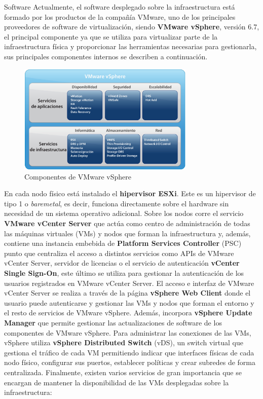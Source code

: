 \begin{section}{Software}
\label{subsec:softwareinstalado}
Actualmente, el software desplegado sobre la infraestructura está formado por los productos de la compañía VMware, uno de los principales proveedores de software de virtualización, siendo \textbf{VMware vSphere}, versión 6.7, el principal componente ya que se utiliza para virtualizar parte de la infraestructura física y proporcionar las herramientas necesarias para gestionarla, sus principales componentes internos se describen a continuación.
\begin{figure}[h]
    \centering
    \includegraphics[width=0.75\textwidth]{imaxes/cap2recursos/contentVSphere}
    \caption{Componentes de VMware vSphere\cite{fotovSphere}}
    \label{fig:vSphere-components}
  \end{figure}
En cada nodo físico está instalado el \textbf{hipervisor ESXi}. Este es un hipervisor de tipo 1 o \textit{baremetal}, es decir, funciona directamente sobre el hardware sin necesidad de un sistema operativo adicional. Sobre los nodos corre el servicio \textbf{VMware vCenter Server} que actúa como centro de administración de todas las máquinas virtuales (VMs) y nodos que forman la infraestructura y, además, contiene una instancia embebida de \textbf{Platform Services Controller} (PSC) punto que centraliza el acceso a distintos servicios como APIs de VMware vCenter Server, servidor de licencias o el servicio de autenticación \textbf{vCenter Single Sign-On}, este último se utiliza para gestionar la autenticación de los usuarios registrados en VMware vCenter Server. El acceso e interfaz de VMware vCenter Server se realiza a través de la página \textbf{vSphere Web Client} donde el usuario puede autenticarse y gestionar las VMs y nodos que forman el entorno y el resto de servicios de VMware vSphere. Además, incorpora \textbf{vSphere Update Manager} que permite gestionar las actualizaciones de software de los componentes de VMware vSphere. Para administrar las conexiones de las VMs, vSphere utiliza \textbf{vSphere Distributed Switch} (vDS), un switch virtual que gestiona el tráfico de cada VM permitiendo indicar que interfaces físicas de cada nodo físico, configurar sus puertos, establecer políticas y crear subredes de forma centralizada. Finalmente, existen varios servicios de gran importancia que se encargan de mantener la disponibilidad de las VMs desplegadas sobre la infraestructura:


\end{section}
